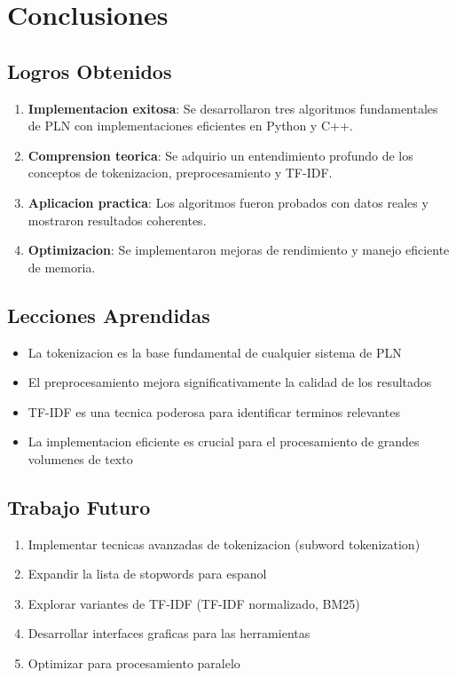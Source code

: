 \documentclass[12pt,a4paper]{article}
\begin{document}
\newpage

\section{Conclusiones}

\subsection{Logros Obtenidos}

\begin{enumerate}
    \item \textbf{Implementacion exitosa}: Se desarrollaron tres algoritmos fundamentales de PLN con implementaciones eficientes en Python y C++.
    
    \item \textbf{Comprension teorica}: Se adquirio un entendimiento profundo de los conceptos de tokenizacion, preprocesamiento y TF-IDF.
    
    \item \textbf{Aplicacion practica}: Los algoritmos fueron probados con datos reales y mostraron resultados coherentes.
    
    \item \textbf{Optimizacion}: Se implementaron mejoras de rendimiento y manejo eficiente de memoria.
\end{enumerate}

\subsection{Lecciones Aprendidas}

\begin{itemize}
    \item La tokenizacion es la base fundamental de cualquier sistema de PLN
    \item El preprocesamiento mejora significativamente la calidad de los resultados
    \item TF-IDF es una tecnica poderosa para identificar terminos relevantes
    \item La implementacion eficiente es crucial para el procesamiento de grandes volumenes de texto
\end{itemize}

\subsection{Trabajo Futuro}

\begin{enumerate}
    \item Implementar tecnicas avanzadas de tokenizacion (subword tokenization)
    \item Expandir la lista de stopwords para espanol
    \item Explorar variantes de TF-IDF (TF-IDF normalizado, BM25)
    \item Desarrollar interfaces graficas para las herramientas
    \item Optimizar para procesamiento paralelo
\end{enumerate}
\end{document}
